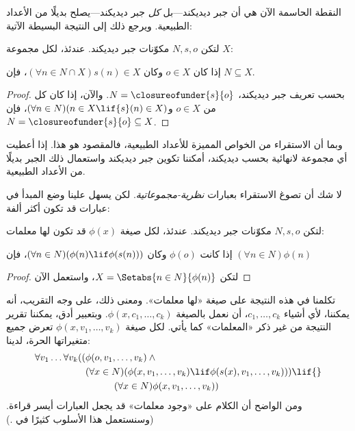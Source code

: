 \documentclass[../../../include/open-logic-section]{subfiles}
\begin{document}

النقطة الحاسمة الآن هي أن جبر ديديكند---بل \emph{كل} جبر
ديديكند---يصلح بديلًا من الأعداد الطبيعية. ويرجع ذلك إلى النتيجة
البسيطة الآتية:

\begin{thm}
لتكن $N, s, o$ مكوّنات جبر ديديكند. عندئذ، لكل مجموعة $X$:  
	\begin{center}
		إذا كان $o \in X$ وكان $(\forall {n} \in N \cap X){s}({n}) \in X$، {فإن} $N \subseteq X$.
	\end{center}
\end{thm}

\begin{proof}
بحسب تعريف جبر ديديكند، $N = \closureofunder{s}{o}$.
والآن، إذا كان كل من ${o} \in X$ و$(\forall {n} \in N)(n \in X \lif
{s}({n}) \in X)$، فإن $N = \closureofunder{s}{o} \subseteq X$.
\end{proof}

وبما أن الاستقراء من الخواص المميزة للأعداد الطبيعية، فالمقصود هو هذا.
إذا أعطيت أي مجموعة لانهائية بحسب ديديكند، أمكننا تكوين جبر ديديكند
واستعمال ذلك الجبر بديلًا من الأعداد الطبيعية.

لا شك أن  تصوغ الاستقراء بعبارات
\emph{نظرية-مجموعاتية}. لكن يسهل علينا وضع المبدأ في عبارات قد تكون
أكثر ألفة:

\begin{cor}
لتكن $N, s, o$ مكوّنات جبر ديديكند. عندئذ، لكل صيغة
$\phi(x)$ قد تكون لها معلمات:
\begin{center}
	إذا كانت $\phi(o)$ وكان $(\forall {n} \in N)(\phi(n)\lif
	\phi({s}({n})))$، {فإن} $(\forall n \in N)\phi(n)$
\end{center}
\end{cor}

\begin{proof}
لتكن $X = \Setabs{n \in N}{\phi(n)}$، واستعمل الآن
\end{proof}

تكلمنا في هذه النتيجة على صيغة «لها معلمات». ومعنى ذلك، على وجه
التقريب، أنه يمكننا، لأي أشياء $c_1, \ldots, c_k$، أن نعمل بالصيغة
$\phi(x, c_1, \ldots, c_k)$. وبتعبير أدق، يمكننا تقرير النتيجة من غير
ذكر «المعلمات» كما يأتي. لكل صيغة $\phi(x, v_1, \ldots, v_k)$ تعرض
جميع متغيراتها الحرة، لدينا:
	\begin{align*}
			\forall v_1 \ldots \forall v_k((&\phi(o, v_1,\ldots, v_k) \land {}\\
			&	(\forall x \in N)(\phi(x,v_1, \ldots, v_k) \lif \phi(s(x), v_1,\ldots, v_k))) \lif {}\\
			&\hspace{3em} (\forall x \in N)\phi(x, v_1,\ldots, v_k))
	\end{align*}
ومن الواضح أن الكلام على «وجود معلمات» قد يجعل العبارات أيسر قراءة.
(وسنستعمل هذا الأسلوب كثيرًا في .)
\end{document}
